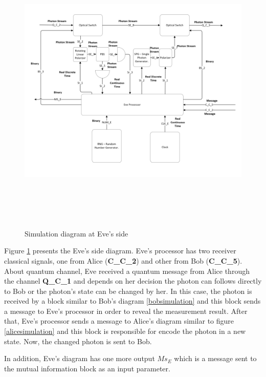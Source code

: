 \begin{figure}[h]
	\centering
	\includegraphics[width=1.1\textwidth, height=14cm]{./sdf/bb84_with_discrete_variables/figures/eve_simulation.png}
	\caption{Simulation diagram at Eve's side}\label{evesimulation}
\end{figure}

Figure \ref{evesimulation} presents the Eve's side diagram. Eve's processor has two receiver classical signals, one from Alice (\textbf{C\_C\_2}) and other from Bob (\textbf{C\_C\_5}). About quantum channel, Eve received a quantum message from Alice through the channel \textbf{Q\_C\_1} and depends on her decision the photon can follows directly to Bob or the photon's state can be changed by her. In this case, the photon is received by a block similar to Bob's diagram \ref{bobsimulation} and this block sends a message to Eve's processor in order to reveal the measurement result. After that, Eve's processor sends a message to Alice's diagram similar to figure \ref{alicesimulation} and this block is responsible for encode the photon in a new state. Now, the changed photon is sent to Bob.

In addition, Eve's diagram has one more output $Ms_{E}$ which is a message sent to the mutual information block as an input parameter.

